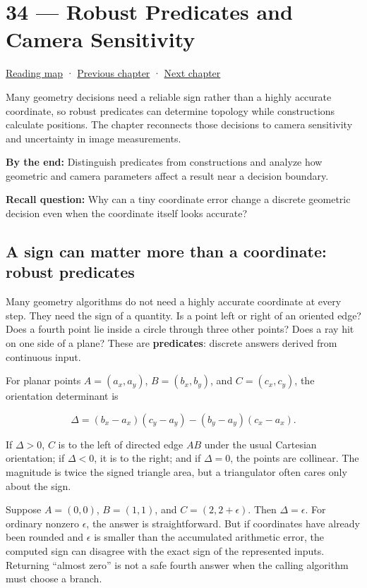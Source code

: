 \hypertarget{02-foundations-ii-ch034}{}
\chapter{34 --- Robust Predicates and Camera Sensitivity}\label{02-foundations-ii-ch034-robust-predicates-and-camera-sensitivity}

\hyperref[volume-reading-map]{Reading map} · \hyperref[02-foundations-ii-ch033]{Previous chapter} · \hyperref[02-foundations-ii-ch035]{Next chapter}

Many geometry decisions need a reliable sign rather than a highly accurate coordinate, so robust predicates can determine topology while constructions calculate positions. The chapter reconnects those decisions to camera sensitivity and uncertainty in image measurements.

\textbf{By the end:} Distinguish predicates from constructions and analyze how geometric and camera parameters affect a result near a decision boundary.

\textbf{Recall question:} Why can a tiny coordinate error change a discrete geometric decision even when the coordinate itself looks accurate?

\section{A sign can matter more than a coordinate: robust predicates}\label{02-foundations-ii-ch034-a-sign-can-matter-more-than-a-coordinate-robust-predicates}

Many geometry algorithms do not need a highly accurate coordinate at every step. They need the sign of a quantity. Is a point left or right of an oriented edge? Does a fourth point lie inside a circle through three other points? Does a ray hit on one side of a plane? These are \textbf{predicates}: discrete answers derived from continuous input.

For planar points \(A=(a_x,a_y)\), \(B=(b_x,b_y)\), and \(C=(c_x,c_y)\), the orientation determinant is

\[
\Delta = (b_x-a_x)(c_y-a_y)-(b_y-a_y)(c_x-a_x).
\]

If \(\Delta>0\), \(C\) is to the left of directed edge \(AB\) under the usual Cartesian orientation; if \(\Delta<0\), it is to the right; and if \(\Delta=0\), the points are collinear. The magnitude is twice the signed triangle area, but a triangulator often cares only about the sign.

Suppose \(A=(0,0)\), \(B=(1,1)\), and \(C=(2,2+\epsilon)\). Then \(\Delta=\epsilon\). For ordinary nonzero \(\epsilon\), the answer is straightforward. But if coordinates have already been rounded and \(\epsilon\) is smaller than the accumulated arithmetic error, the computed sign can disagree with the exact sign of the represented inputs. Returning ``almost zero'' is not a safe fourth answer when the calling algorithm must choose a branch.

